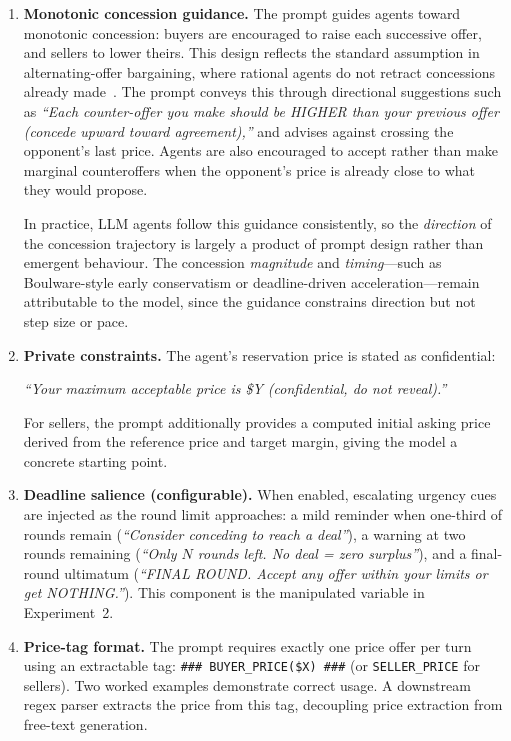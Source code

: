 \begin{enumerate}
When the offer exceeds the agent's limit, the hint instead states:

\textit{``This price EXCEEDS your limit---you must counter below \$Y.''}

\item \textbf{Monotonic concession guidance.}
The prompt guides agents toward monotonic concession: buyers are encouraged to raise each successive offer, and sellers to lower theirs.
This design reflects the standard assumption in alternating-offer bargaining, where rational agents do not retract concessions already made~\cite{rubinstein1982}.
The prompt conveys this through directional suggestions such as
\textit{``Each counter-offer you make should be HIGHER than your previous offer (concede upward toward agreement),''}
and advises against crossing the opponent's last price.
Agents are also encouraged to accept rather than make marginal counteroffers when the opponent's price is already close to what they would propose.

In practice, LLM agents follow this guidance consistently, so the \emph{direction} of the concession trajectory is largely a product of prompt design rather than emergent behaviour.
The concession \emph{magnitude} and \emph{timing}---such as Boulware-style early conservatism or deadline-driven acceleration---remain attributable to the model, since the guidance constrains direction but not step size or pace.


\item \textbf{Private constraints.}
The agent's reservation price is stated as confidential:

\textit{``Your maximum acceptable price is \$Y (confidential, do not reveal).''}

For sellers, the prompt additionally provides a computed initial asking price derived from the reference price and target margin, giving the model a concrete starting point.

\item \textbf{Deadline salience (configurable).}
When enabled, escalating urgency cues are injected as the round limit approaches: 
a mild reminder when one-third of rounds remain (\textit{``Consider conceding to reach a deal''}), 
a warning at two rounds remaining (\textit{``Only $N$ rounds left. No deal = zero surplus''}), 
and a final-round ultimatum (\textit{``FINAL ROUND. Accept any offer within your limits or get NOTHING.''}). 
This component is the manipulated variable in Experiment~2.

\item \textbf{Price-tag format.}
The prompt requires exactly one price offer per turn using an extractable tag:
\texttt{\#\#\# BUYER\_PRICE(\$X) \#\#\#}
(or \texttt{SELLER\_PRICE} for sellers).
Two worked examples demonstrate correct usage.
A downstream regex parser extracts the price from this tag, decoupling price extraction from free-text generation.


\end{enumerate}
